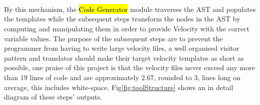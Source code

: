 	\hspace*{\fill}\\
	\hspace*{\fill}\\
	\hspace*{\fill}\\
	\mbox{}
	\hfill\break
	\rmfamily
	By this mechanism, the \ttfamily\ttfamily\hl{Code Generator} \rmfamily \rmfamily module traverses the AST and populates the templates while the subsequent steps transform the nodes in the AST by computing and manipulating them in order to provide Velocity with the correct variable values. The purpose of the subsequent steps are to prevent the programmer from having to write large velocity files, a well organised visitor pattern and translator should make their target velocity templates as short as possible, one praise of this project is that the velocity files never exceed any more than $19$ lines of code and are approximately $2.67$, rounded to $3$, lines long on average, this includes white-space. Fig\ref{fig:toolStructure} shows an in detail diagram of these steps' outputs.

